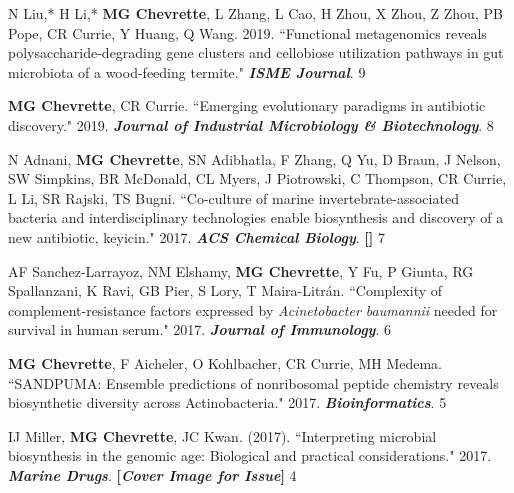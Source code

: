 \begin{cvpubs}
\cvpub
{N Liu,* H Li,* \textbf{MG Chevrette}, L Zhang, L Cao, H Zhou, X Zhou, Z Zhou, PB Pope, CR Currie, Y Huang, Q Wang. 2019. ``Functional metagenomics reveals polysaccharide-degrading gene clusters and cellobiose utilization pathways in gut microbiota of a wood-feeding termite." \textit{\textbf{ISME Journal}}. \textbf{\textit{}}}
{9}

\cvpub
{\textbf{MG Chevrette}, CR Currie. ``Emerging evolutionary paradigms in antibiotic discovery." 2019. \textit{\textbf{Journal of Industrial Microbiology \& Biotechnology}}. \textbf{\textit{}}}
{8}

\cvpub
{N Adnani, \textbf{MG Chevrette}, SN Adibhatla, F Zhang, Q Yu, D Braun, J Nelson, SW Simpkins, BR McDonald, CL Myers, J Piotrowski, C Thompson, CR Currie, L Li, SR Rajski, TS Bugni. ``Co-culture of marine invertebrate-associated bacteria and interdisciplinary technologies enable biosynthesis and discovery of a new antibiotic, keyicin." 2017. \textit{\textbf{ACS Chemical Biology}}.  \textbf{\textit{}} \linebreak \textbf{[\textit{}]}}
{7}

\cvpub
{AF Sanchez-Larrayoz, NM Elshamy, \textbf{MG Chevrette}, Y Fu, P Giunta, RG Spallanzani, K Ravi, GB Pier, S Lory, T Maira-Litr\'{a}n. ``Complexity of complement-resistance factors expressed by \textit{Acinetobacter baumannii} needed for survival in human serum." 2017. \textit{\textbf{Journal of Immunology}}. \textbf{\textit{}}}
{6}

\end{cvpubs} \begin{cvpubs}

\cvpub
{\textbf{MG Chevrette}, F Aicheler, O Kohlbacher, CR Currie, MH Medema. ``SANDPUMA: Ensemble predictions of nonribosomal peptide chemistry reveals biosynthetic diversity across Actinobacteria." 2017. \textit{\textbf{Bioinformatics}}. \textbf{\textit{}}}
{5}

\cvpub
{IJ Miller, \textbf{MG Chevrette}, JC Kwan. (2017). ``Interpreting microbial biosynthesis in the genomic age: Biological and practical considerations." 2017. \textit{\textbf{Marine Drugs}}. \textbf{\textit{}} \linebreak \textbf{[\textit{Cover Image for Issue}]}}
{4}


\end{cvpubs}
